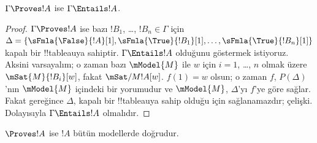 \begin{cor}
$\Gamma \Proves !A$ ise $\Gamma \Entails !A$.
\end{cor}

\begin{proof}
  $\Gamma \Proves !A$ ise bazı $!B_1$, \dots, $!B_n \in \Gamma$ için
  $\Delta = \{\sFmla{\False}{!A}[1], \sFmla{\True}{!B_1}[1],
  \dots, \sFmla{\True}{!B_n}[1]\}$ kapalı bir !!{tableau}{}ya sahiptir.
  $\Gamma \Entails !A$ olduğunu göstermek istiyoruz. Aksini varsayalım; o
  zaman bazı $\mModel{M}$ ile $w$ için $i=1$, \dots, $n$ olmak üzere
  $\mSat{M}{!B_i}[w]$, fakat $\mSat/{M}{!A}[w]$. $f(1)=w$ olsun; o zaman
  $f$, $P(\Delta)$'nın $\mModel{M}$ içindeki bir yorumudur ve $\mModel{M}$,
  $\Delta$'yı $f$'ye göre sağlar. Fakat 
  gereğince $\Delta$, kapalı bir !!{tableau}{}ya sahip olduğu için sağlanamazdır;
  çelişki. Dolayısıyla $\Gamma \Entails !A$ olmalıdır.
\end{proof}

\begin{cor}
$\Proves !A$ ise $!A$ bütün modellerde doğrudur.
\end{cor}

